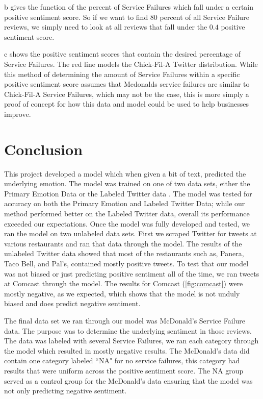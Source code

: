 \documentclass[titlepage,letterpaper]{article}
\begin{document}
b gives the function of the percent of Service Failures which fall under a certain positive sentiment score. So if we want to find $80$ percent of all Service Failure reviews, we simply need to look at all reviews that fall under the $0.4$ positive sentiment score. 

c shows the positive sentiment scores that contain the desired percentage of Service Failures. The red line models the Chick-Fil-A Twitter distribution. While this method of determining the amount of Service Failures within a specific positive sentiment score assumes that Mcdonalds service failures are similar to Chick-Fil-A Service Failures, which may not be the case, this is more simply a proof of concept for how this data and model could be used to help businesses improve.  

\section{Conclusion}
This project developed a model which when given a bit of text, predicted the underlying emotion. The model was trained on one of two data sets, either the Primary Emotion Data \cite{lowriwilliams} or the Labeled Twitter data \cite{LabeledTwitter}. The model was tested for accuracy on both the Primary Emotion and Labeled Twitter Data; while our method performed better on the Labeled Twitter data, overall its performance exceeded our expectations. Once the model was fully developed and tested, we ran the model on two unlabeled data sets. First we scraped Twitter for tweets at various restaurants and ran that data through the model. The results of the unlabeled Twitter data showed that most of the restaurants such as, Panera, Taco Bell, and Pal's, contained mostly positive tweets. To test that our model was not biased or just predicting positive sentiment all of the time, we ran tweets at Comcast through the model. The results for Comcast (\cref{fig:comcast}) were mostly negative, as we expected, which shows that the model is not unduly biased and does predict negative sentiment. 

The final data set we ran through our model was McDonald's Service Failure data. The purpose was to determine the underlying sentiment in those reviews. The data was labeled with several Service Failures, we ran each category through the model which resulted in mostly negative results. The McDonald's data did contain one category labeled ``NA" for no service failures, this category had results that were uniform across the positive sentiment score. The NA group served as a control group for the McDonald's data ensuring that the model was not only predicting negative sentiment. 
\end{document}

